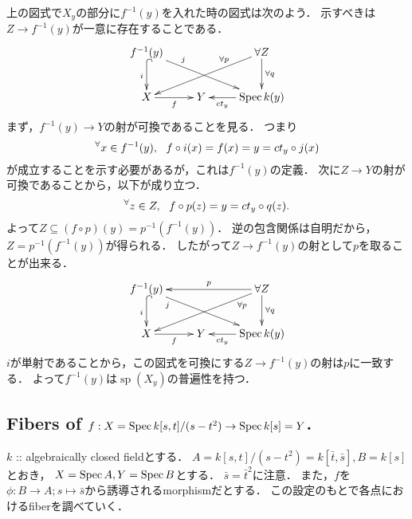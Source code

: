 \documentclass[a4paper]{jsarticle}
\newcommand{\basesp}{\operatorname{sp}}
\begin{document}
    上の図式で$X_y$の部分に$f^{-1}(y)$を入れた時の図式は次のよう．
    示すべきは$Z \to f^{-1}(y)$が一意に存在することである．
    \[
    \xymatrix
    {
    \ar@{^{(}->}[d]_-{i} \ar[drr]^(0.3){j} f^{-1}(y) & {} & \forall Z \ar[d]^-{\forall q} \ar[dll]_(0.3){\forall p}\\
    X \ar[r]_-{f} & Y & \ar[l]^-{ct_y} \Spec k(y)
    }
    \]
    まず，$f^{-1}(y) \to Y$の射が可換であることを見る．
    つまり
    \[ {}^{\forall} x \in f^{-1}(y),~~ f \circ i(x)=f(x)=y=ct_y \circ j(x) \]
    が成立することを示す必要があるが，これは$f^{-1}(y)$の定義．
    次に$Z \to Y$の射が可換であることから，以下が成り立つ．
    \[ {}^{\forall} z \in Z,~~ f \circ p(z)=y=ct_y \circ q(z). \]
    よって$Z \subseteq (f \circ p)(y)=p^{-1}(f^{-1}(y))$．
    逆の包含関係は自明だから，$Z=p^{-1}(f^{-1}(y))$が得られる．
    したがって$Z \to f^{-1}(y)$の射として$p$を取ることが出来る．
    \[
    \xymatrix
    {
    \ar@{^{(}->}[d]_-{i} \ar[drr]_(0.2){j} f^{-1}(y) & {} & \ar[ll]_-{p} \forall Z \ar[d]^-{\forall q} \ar[dll]^(0.2){\forall p}\\
    X \ar[r]_-{f} & Y & \ar[l]^-{ct_y} \Spec k(y)
    }
    \]
    $i$が単射であることから，この図式を可換にする$Z \to f^{-1}(y)$の射は$p$に一致する．
    よって$f^{-1}(y)$は$\basesp(X_y)$の普遍性を持つ．

\subsection{Fibers of $f: X=\operatorname{Spec} k[s,t]/(s-t^2) \to \operatorname{Spec} k[s]=Y$.}
    $k$ :: algebraically closed fieldとする．
    $A=k[s,t]/(s-t^2)=k[\bar{t},\bar{s}], B=k[s]$とおき，
    $X=\operatorname{Spec} A, Y=\operatorname{Spec} B$とする．
    $\bar{s}=\bar{t}^2$に注意．
    また，$f$を$\phi: B \to A; s \mapsto \bar{s}$から誘導されるmorphismだとする．
    この設定のもとで各点におけるfiberを調べていく．
\end{document}
